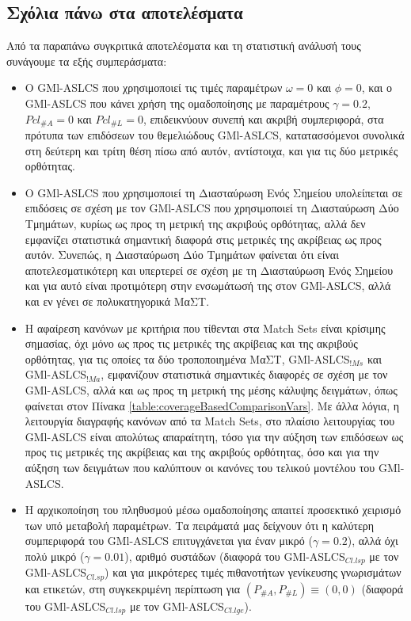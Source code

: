 \subsection{Σχόλια πάνω στα αποτελέσματα}
\label{subsec:resComm}
Από τα παραπάνω συγκριτικά αποτελέσματα και τη στατιστική ανάλυσή τους συνάγουμε τα εξής συμπεράσματα:
\begin{itemize}
\item Ο GMl-ASLCS που χρησιμοποιεί τις τιμές παραμέτρων $\omega=0$ και $\phi=0$, και ο GMl-ASLCS που κάνει χρήση της ομαδοποίησης με παραμέτρους $\gamma=0.2$, $Pcl_{\#A}=0$ και $Pcl_{\#L}=0$, επιδεικνύουν συνεπή και ακριβή συμπεριφορά, στα πρότυπα των επιδόσεων του θεμελιώδους GMl-ASLCS, κατατασσόμενοι συνολικά στη δεύτερη και τρίτη θέση πίσω από αυτόν, αντίστοιχα, και για τις δύο μετρικές ορθότητας.

\item Ο GMl-ASLCS που χρησιμοποιεί τη Διασταύρωση Ενός Σημείου υπολείπεται σε επιδόσεις σε σχέση με τον GMl-ASLCS που χρησιμοποιεί τη Διασταύρωση Δύο Τμημάτων, κυρίως ως προς τη μετρική της ακριβούς ορθότητας, αλλά δεν εμφανίζει στατιστικά σημαντική διαφορά στις μετρικές της ακρίβειας ως προς αυτόν. Συνεπώς, η Διασταύρωση Δύο Τμημάτων φαίνεται ότι είναι αποτελεσματικότερη και υπερτερεί σε σχέση με τη Διασταύρωση Ενός Σημείου και για αυτό είναι προτιμότερη στην ενσωμάτωσή της στον GMl-ASLCS, αλλά και εν γένει σε πολυκατηγορικά ΜαΣΤ.

\item Η αφαίρεση κανόνων με κριτήρια που τίθενται στα Match Sets είναι κρίσιμης σημασίας, όχι μόνο ως προς τις μετρικές της ακρίβειας και της ακριβούς ορθότητας, για τις οποίες τα δύο τροποποιημένα ΜαΣΤ, GMl-ASLCS$_{!Ms}$ και GMl-ASLCS$_{!Ma}$, εμφανίζουν στατιστικά σημαντικές διαφορές σε σχέση με τον GMl-ASLCS, αλλά και ως προς τη μετρική της μέσης κάλυψης δειγμάτων, όπως φαίνεται στον Πίνακα \ref{table:coverageBasedComparisonVars}. Με άλλα λόγια, η λειτουργία διαγραφής κανόνων από τα Match Sets, στο πλαίσιο λειτουργίας του GMl-ASLCS είναι απολύτως απαραίτητη, τόσο για την αύξηση των επιδόσεων ως προς τις μετρικές της ακρίβειας και της ακριβούς ορθότητας, όσο και για την αύξηση των δειγμάτων που καλύπτουν οι κανόνες του τελικού μοντέλου του GMl-ASLCS.

\item Η αρχικοποίηση του πληθυσμού μέσω ομαδοποίησης απαιτεί προσεκτικό χειρισμό των υπό μεταβολή παραμέτρων. Τα πειράματά μας δείχνουν ότι η καλύτερη συμπεριφορά του GMl-ASLCS επιτυγχάνεται για έναν μικρό ($\gamma=0.2$), αλλά όχι πολύ μικρό ($\gamma=0.01$), αριθμό συστάδων (διαφορά του GMl-ASLCS$_{Cl.lsp}$ με τον GMl-ASLCS$_{Cl.sp}$) και για μικρότερες τιμές πιθανοτήτων γενίκευσης γνωρισμάτων και ετικετών, στη συγκεκριμένη περίπτωση για $(P_{\#A}, P_{\#L}) \equiv (0,0)$ (διαφορά του GMl-ASLCS$_{Cl.lsp}$ με τον GMl-ASLCS$_{Cl.lge}$).


\end{itemize}

